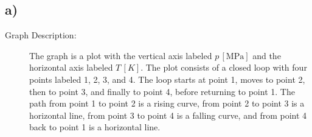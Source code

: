 

\subsection*{a)}

\begin{description}
    \item[Graph Description:] The graph is a plot with the vertical axis labeled $p \, [\text{MPa}]$ and the horizontal axis labeled $T \, [K]$. The plot consists of a closed loop with four points labeled 1, 2, 3, and 4. The loop starts at point 1, moves to point 2, then to point 3, and finally to point 4, before returning to point 1. The path from point 1 to point 2 is a rising curve, from point 2 to point 3 is a horizontal line, from point 3 to point 4 is a falling curve, and from point 4 back to point 1 is a horizontal line.
\end{description}